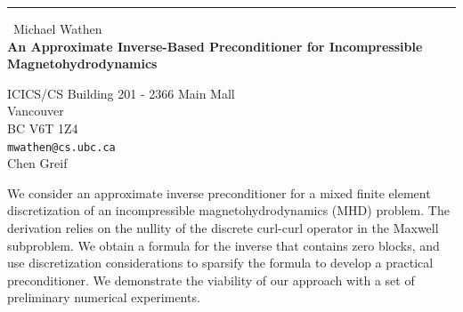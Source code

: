 \documentclass{report}
\begin{document}
\begin{center}
\rule{6in}{1pt} \
{\large Michael Wathen \\
{\bf An Approximate Inverse-Based Preconditioner for Incompressible Magnetohydrodynamics}}

ICICS/CS Building 201 - 2366 Main Mall \\ Vancouver \\ BC V6T 1Z4
\\
{\tt mwathen@cs.ubc.ca}\\
Chen Greif\end{center}

We consider an approximate inverse preconditioner for a mixed finite
element discretization of an incompressible magnetohydrodynamics (MHD)
problem. The derivation relies on the nullity of the discrete curl-curl
operator in the Maxwell subproblem. We obtain a formula for the inverse
that contains zero blocks, and use discretization considerations to
sparsify the formula to develop a practical preconditioner. We
demonstrate the viability of our approach with a set of preliminary
numerical experiments.
\end{document}
